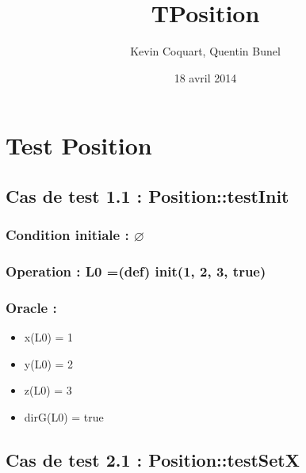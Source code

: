 \documentclass[11pt]{article}
\title{TPosition}
\author{Kevin Coquart, Quentin Bunel}
\date{18 avril 2014}
\begin{document}
\maketitle

\setcounter{tocdepth}{3}
\tableofcontents
\vspace*{1cm}
\section{Test Position}
\label{sec-1}


\subsection{Cas de test 1.1 : Position::testInit}
\label{sec-1.1}

\subsubsection{Condition initiale : $\varnothing$}
\label{sec-1.1.1}

\subsubsection{Operation : L0 =(def) init(1, 2, 3, true)}
\label{sec-1.1.2}

\subsubsection{Oracle :}
\label{sec-1.1.3}

\begin{itemize}

\item x(L0) = 1\\
\label{sec-1.1.3.1}


\item y(L0) = 2\\
\label{sec-1.1.3.2}


\item z(L0) = 3\\
\label{sec-1.1.3.3}


\item dirG(L0) = true\\
\label{sec-1.1.3.4}



\end{itemize} %
\subsection{Cas de test 2.1 : Position::testSetX}
\label{sec-1.2}
\end{document}
